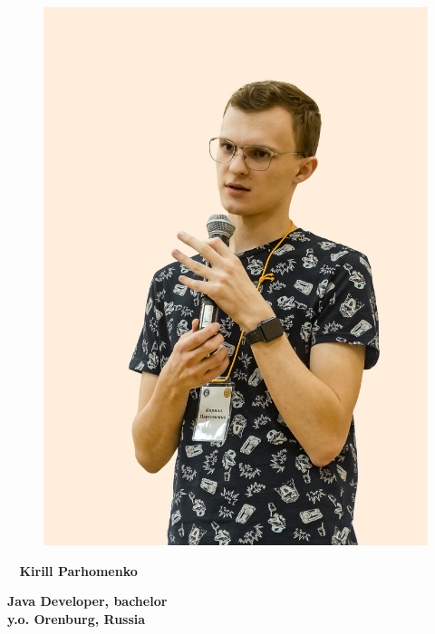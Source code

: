 \begin{figure}
	\hfill
	\includegraphics[width=1.0\columnwidth]{photo}
	\vspace{-7cm}
\end{figure}

\begin{flushright}\small

\end{flushright}\normalsize
\framebreak



\Huge\bfseries\ {{\color{Cyan} Kirill} {\color{Black} Parhomenko}} \\
\NegativeSmallSep

\normalsize\bfseries Java Developer, bachelor \\
\small { y.o. Orenburg, Russia}

